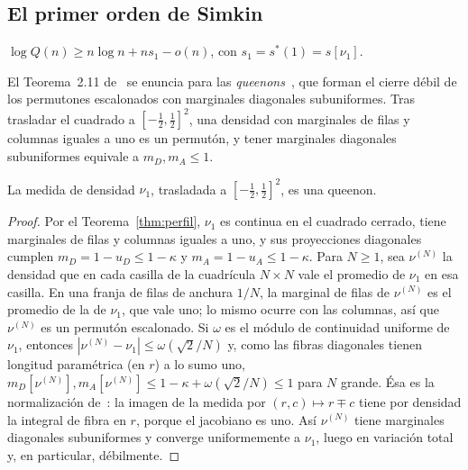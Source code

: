 \subsection{El primer orden de Simkin}

\begin{teorema}\label{thm:simkin}
$\log Q(n)\ge n\log n+ns_1-o(n)$, con $s_1=s^*(1)=s[\nu_1]$.
\end{teorema}

El Teorema~2.11 de~\cite{Simkin} se enuncia para las
\emph{queenons}~\cite[Definiciones~2.1, 2.3 y~2.4]{Simkin}, que forman el cierre débil de los
permutones escalonados con marginales diagonales subuniformes. Tras trasladar el cuadrado a
$[-\frac12,\frac12]^2$, una densidad con marginales de filas y columnas iguales a uno es un
permutón, y tener marginales diagonales subuniformes equivale a $m_D,m_A\le1$.

\begin{lema}\label{lem:queenon}
La medida de densidad $\nu_1$, trasladada a $[-\frac12,\frac12]^2$, es una queenon.
\end{lema}

\begin{proof}
Por el Teorema~\ref{thm:perfil}, $\nu_1$ es continua en el cuadrado cerrado, tiene marginales
de filas y columnas iguales a uno, y sus proyecciones diagonales cumplen
$m_D=1-u_D\le1-\kappa$ y $m_A=1-u_A\le1-\kappa$. Para $N\ge1$, sea $\nu^{(N)}$ la densidad que
en cada casilla de la cuadrícula $N\times N$ vale el promedio de $\nu_1$ en esa casilla. En una
franja de filas de anchura $1/N$, la marginal de filas de $\nu^{(N)}$ es el promedio de la de
$\nu_1$, que vale uno; lo mismo ocurre con las columnas, así que $\nu^{(N)}$ es un permutón
escalonado. Si $\omega$ es el módulo de continuidad uniforme de $\nu_1$, entonces
$|\nu^{(N)}-\nu_1|\le\omega(\sqrt2/N)$ y, como las fibras diagonales tienen longitud
paramétrica (en $r$) a lo sumo uno, $m_D[\nu^{(N)}],m_A[\nu^{(N)}]\le1-\kappa+\omega(\sqrt2/N)\le1$
para $N$ grande. Ésa es la normalización de~\cite{Simkin}: la imagen de la medida por
$(r,c)\mapsto r\mp c$ tiene por densidad la integral de fibra en $r$, porque el jacobiano es uno.
Así $\nu^{(N)}$ tiene marginales diagonales subuniformes y converge uniformemente a $\nu_1$,
luego en variación total y, en particular, débilmente.
\end{proof}

